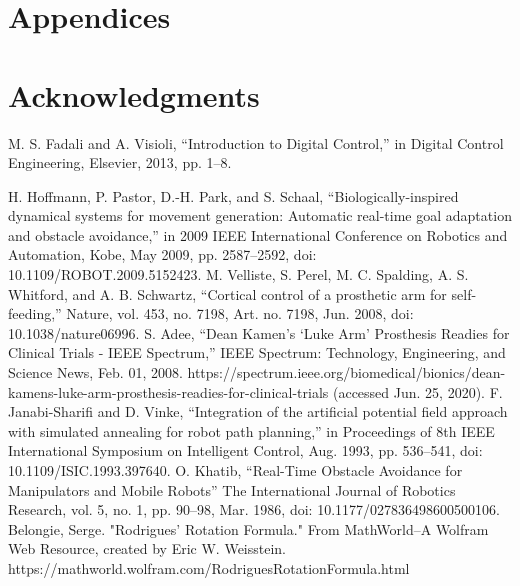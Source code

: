 \documentclass[a4paper, 10pt, conference]{ieeeconf}      %
\begin{document}
\section*{Appendices}

\section*{Acknowledgments}




\begin{thebibliography}{99}

 M. S. Fadali and A. Visioli, “Introduction to Digital Control,” in Digital Control Engineering, Elsevier, 2013, pp. 1–8.


 H. Hoffmann, P. Pastor, D.-H. Park, and S. Schaal, “Biologically-inspired dynamical systems for movement generation: Automatic real-time goal adaptation and obstacle avoidance,” in 2009 IEEE International Conference on Robotics and Automation, Kobe, May 2009, pp. 2587–2592, doi: 10.1109/ROBOT.2009.5152423.
 M. Velliste, S. Perel, M. C. Spalding, A. S. Whitford, and A. B. Schwartz, “Cortical control of a prosthetic arm for self-feeding,” Nature, vol. 453, no. 7198, Art. no. 7198, Jun. 2008, doi: 10.1038/nature06996.
 S. Adee, “Dean Kamen’s ‘Luke Arm’ Prosthesis Readies for Clinical Trials - IEEE Spectrum,” IEEE Spectrum: Technology, Engineering, and Science News, Feb. 01, 2008. https://spectrum.ieee.org/biomedical/bionics/dean-kamens-luke-arm-prosthesis-readies-for-clinical-trials (accessed Jun. 25, 2020).
 F. Janabi-Sharifi and D. Vinke, “Integration of the artificial potential field approach with simulated annealing for robot path planning,” in Proceedings of 8th IEEE International Symposium on Intelligent Control, Aug. 1993, pp. 536–541, doi: 10.1109/ISIC.1993.397640.
 O. Khatib, “Real-Time Obstacle Avoidance for Manipulators and Mobile Robots” The International Journal of Robotics Research, vol. 5, no. 1, pp. 90–98, Mar. 1986, doi: 10.1177/027836498600500106.
  Belongie, Serge. "Rodrigues' Rotation Formula." From MathWorld--A Wolfram Web Resource, created by Eric W. Weisstein. https://mathworld.wolfram.com/RodriguesRotationFormula.html 



\end{thebibliography}
\end{document}
